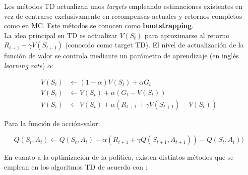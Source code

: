 Los métodos TD actualizan unos \textit{targets} empleando estimaciones existentes en vez de centrarse exclusivamente en recompensas actuales y retornos completos como en MC. Este métodos se conocen como \textbf{bootstrapping}. \\

La idea principal en TD es actualizar $V(S_t)$ para aproximarse al retorno $R_{t+1} + \gamma V(S_{t+1})$ (conocido como target TD). El nivel de actualización de la función de valor se controla mediante un parámetro de aprendizaje (en inglés \textit{learning rate}) $\alpha$:

\begin{equation*}
\begin{split}
   V(S_t) &\leftarrow (1 - \alpha)V(S_t) + \alpha G_t \\
   V(S_t) &\leftarrow V(S_t) + \alpha(G_t - V(S_t)) \\
   V(S_t) &\leftarrow V(S_t) + \alpha(R_{t+1} + \gamma V(S_{t+1}) - V(S_t))
\end{split}
\end{equation*}

Para la función de acción-valor: 

\[Q(S_t, A_t) \leftarrow Q(S_t, A_t) + \alpha(R_{t+1} + \gamma Q(S_{t+1}, A_{t+1})) - Q(S_t, A_t))\]

En cuanto a la optimización de la política, existen distintos métodos que se emplean en los algoritmos TD de acuerdo con \cite{lilLogRL}:

